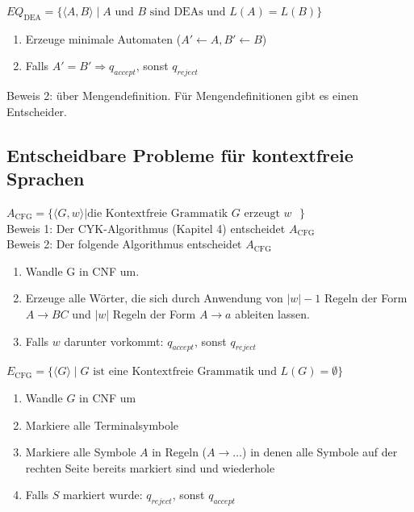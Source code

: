 \documentclass[a4paper]{article}
\begin{document}
	\begin{falgo}[Gleichheitsproblem]
		$EQ_{\text{DEA}} = \{ \langle A,B \rangle \mid \text{$A$ und $B$ sind DEAs und $L(A)=L(B)$} \}$
		\begin{enumerate}
			\item Erzeuge minimale Automaten ($A' \leftarrow A, B' \leftarrow B$)
			\item Falls $A' = B' \Rightarrow q_{accept}$, sonst $q_{reject} $
		\end{enumerate}
		Beweis 2: über Mengendefinition. Für Mengendefinitionen gibt es einen Entscheider.
	\end{falgo}

\subsection{Entscheidbare Probleme für kontextfreie Sprachen}
	\begin{falgo}[Akzeptanzproblem]
		$A_{\text{CFG}} = \{ \langle G,w \rangle | \text{die Kontextfreie Grammatik $G$ erzeugt $w$ } \}$ \\
		Beweis 1: Der CYK-Algorithmus (Kapitel 4) entscheidet $A_{\text{CFG}}$ \\
		Beweis 2: Der folgende Algorithmus entscheidet $A_{\text{CFG}}$
		\begin{enumerate}
			\item Wandle G in CNF um.
			\item Erzeuge alle Wörter, die sich durch Anwendung von $|w|-1$ Regeln der Form $A \rightarrow BC$ und $|w|$ Regeln der Form $A \rightarrow a$ ableiten lassen.
			\item Falls $w$ darunter vorkommt: $q_{accept}$, sonst $q_{reject}$
		\end{enumerate}
	\end{falgo}
	
	\begin{falgo}[Leerheitsproblem]
		$E_{\text{CFG}} = \{ \langle G \rangle \mid \text{$G$ ist eine Kontextfreie Grammatik und $L(G)=\emptyset$} \}$ \\
		\begin{enumerate}
			\item Wandle $G$ in CNF um
			\item Markiere alle Terminalsymbole
			\item Markiere alle Symbole $A$ in Regeln ($A \rightarrow \dots$) in denen alle Symbole auf der rechten Seite bereits markiert sind und wiederhole
			\item Falls $S$ markiert wurde: $q_{reject}$, sonst $q_{accept}$
		\end{enumerate}
	\end{falgo}
	
\end{document}
